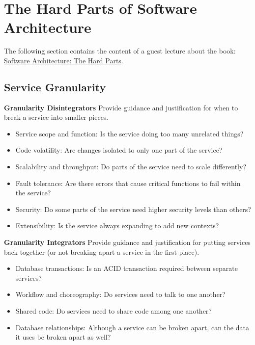 \section{The Hard Parts of Software Architecture}
The following section contains the content of a guest lecture about the book: \href{https://www.oreilly.com/library/view/software-architecture-the/9781492086888/}{Software Architecture: The Hard Parts}.

\subsection{Service Granularity}
\begin{minipage}[t]{0.5\textwidth}
	\textbf{Granularity Disintegrators}
	Provide guidance and justification for when to break a service into smaller pieces.
	\begin{itemize}
		\item Service scope and function: Is the service doing too many unrelated things?
		\item Code volatility: Are changes isolated to only one part of the service?
		\item Scalability and throughput: Do parts of the service need to scale differently?
		\item Fault tolerance: Are there errors that cause critical functions to fail within the service?
		\item Security: Do some parts of the service need higher security levels than others?
		\item Extensibility: Is the service always expanding to add new contexts?
	\end{itemize}
\end{minipage}
\begin{minipage}[t]{0.5\textwidth}
	\textbf{Granularity Integrators}
	Provide guidance and justification for putting services back together (or not breaking apart a service in the first place).
	\begin{itemize}
		\item Database transactions: Is an ACID transaction required between separate services?
		\item Workflow and choreography: Do services need to talk to one another?
		\item Shared code: Do services need to share code among one another?
		\item Database relationships: Although a service can be broken apart, can the data it uses be broken apart as well?
	\end{itemize}
\end{minipage}

